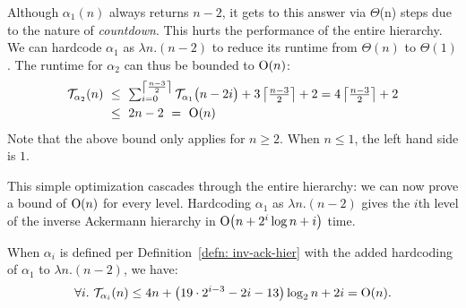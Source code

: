 \begin{rem} \label{rem: inv-ack-hardcode}
Although $\alpha_1 (n)$ always returns $n-2$, it gets to this answer
via $\Theta$(n) steps due to the nature of \emph{countdown}.
This hurts the performance of the entire hierarchy. 
We can hardcode $\alpha_1$ as $\lambda n.(n-2)$ to reduce its runtime
from $\Theta(n)$ to $\Theta(1)$.
The runtime for $\alpha_2$ can thus be bounded to $\text{O}(n)$:
\begin{equation*}
\begin{aligned}
\mathcal{T}_{\alpha_2}(n)
& \ \le \ \textstyle \sum_{i=0}^{\left\lceil \frac{n-3}{2} \right\rceil} \mathcal{T}_{\alpha_1}\big(n-2i\big) + 3\left\lceil \frac{n-3}{2} \right\rceil + 2  =  4\left\lceil \frac{n-3}{2} \right\rceil + 2 \\
& \ \le\ 2n - 2 \ = \ \text{O}(n)
\end{aligned}
\end{equation*}
Note that the above bound only applies for $n\ge 2$. When $n\le 1$, the left hand side is $1$.
\end{rem}

\noindent This simple optimization cascades through the entire hierarchy:
we can now prove a bound of $\text{O}(n)$ for every level.
Hardcoding $\alpha_1$ as $\lambda n.(n-2)$ gives the $i$th level of the inverse Ackermann hierarchy in $\text{O}\big(n + 2^i\log n  + i\big)$ time.
\begin{thm} \label{thm: inv-ack-hier-runtime-improved}
	When $\alpha_i$ is defined per Definition~\ref{defn: inv-ack-hier} with the added hardcoding of $\alpha_1$ to $\lambda n. (n - 2)$, we have:
	\begin{equation*}
	\forall i.~\mathcal{T}_{\alpha_i}(n) \le 4n + \left(19\cdot 2^{i-3} - 2i - 13\right)\log_2n + 2i = \text{O}(n).
	\end{equation*}
\end{thm}

